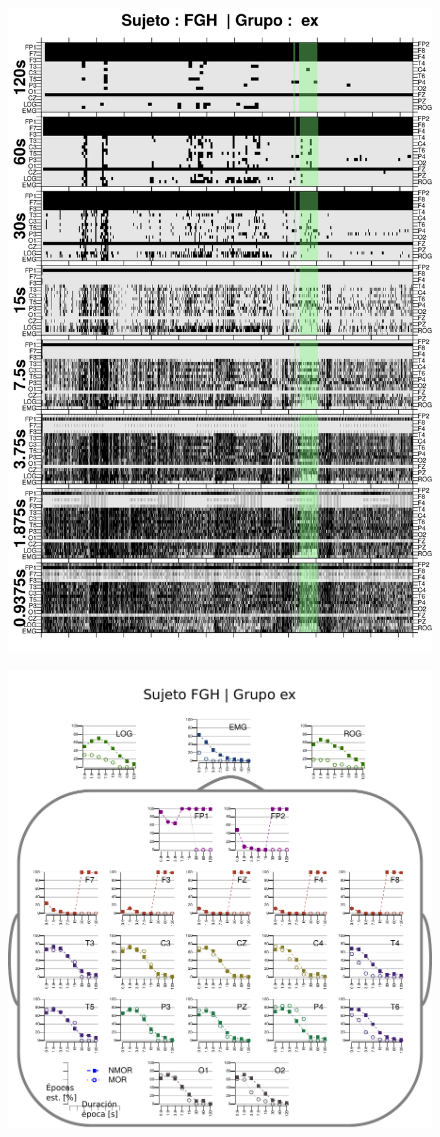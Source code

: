 \begin{figure}
\centering
\includegraphics[width=0.9\linewidth]
{./img_ejemplos/FGHSUE_comp_est_.png} 
\end{figure}

\begin{figure}
\centering
\includegraphics[width=.9\linewidth]{./img_resultados/cabeza_FGH.pdf}
\end{figure}

